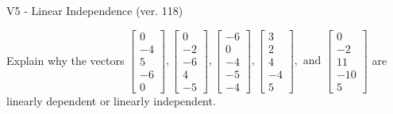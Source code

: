 \begin{exercise}
  \begin{exerciseTitle}V5 - Linear Independence (ver. 118)\end{exerciseTitle}
  \begin{exerciseStatement}
    Explain why the vectors \(\left[\begin{array}{r}
0 \\
-4 \\
5 \\
-6 \\
0
\end{array}\right] , \left[\begin{array}{r}
0 \\
-2 \\
-6 \\
4 \\
-5
\end{array}\right] , \left[\begin{array}{r}
-6 \\
0 \\
-4 \\
-5 \\
-4
\end{array}\right] , \left[\begin{array}{r}
3 \\
2 \\
4 \\
-4 \\
5
\end{array}\right] , \text{ and } \left[\begin{array}{r}
0 \\
-2 \\
11 \\
-10 \\
5
\end{array}\right]\) are linearly dependent or linearly independent.	



\end{exerciseStatement}
\end{exercise}
